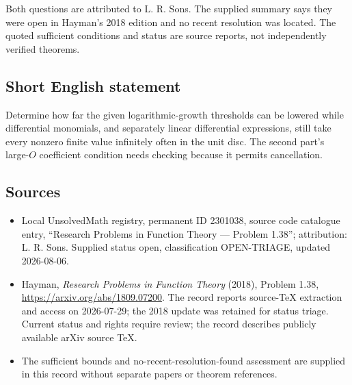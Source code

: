 \documentclass[11pt]{article}
\begin{document}
Both questions are attributed to L. R. Sons. The supplied summary says they were open in Hayman's 2018 edition and no recent resolution was located. The quoted sufficient conditions and status are source reports, not independently verified theorems.
\subsection{Short English statement}
Determine how far the given logarithmic-growth thresholds can be lowered while differential monomials, and separately linear differential expressions, still take every nonzero finite value infinitely often in the unit disc. The second part's large-$O$ coefficient condition needs checking because it permits cancellation.
\subsection{Sources}
\begin{itemize}
\item Local UnsolvedMath registry, permanent ID 2301038, source code catalogue entry, ``Research Problems in Function Theory --- Problem 1.38''; attribution: L. R. Sons. Supplied status open, classification OPEN-TRIAGE, updated 2026-08-06.
\item Hayman, \emph{Research Problems in Function Theory} (2018), Problem 1.38, \url{https://arxiv.org/abs/1809.07200}. The record reports source-TeX extraction and access on 2026-07-29; the 2018 update was retained for status triage. Current status and rights require review; the record describes publicly available arXiv source TeX.
\item The sufficient bounds and no-recent-resolution-found assessment are supplied in this record without separate papers or theorem references.
\end{itemize}
\end{document}
